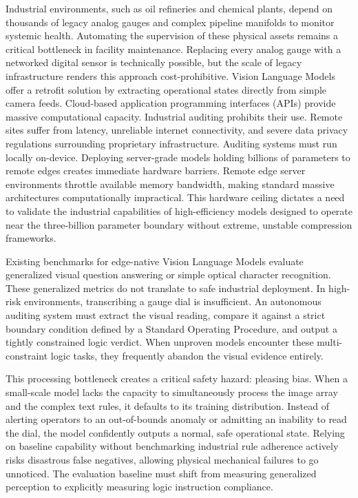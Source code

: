 \documentclass{article}
\begin{document}
Industrial environments, such as oil refineries and chemical plants, depend on thousands of legacy analog gauges and complex pipeline manifolds to monitor systemic health. Automating the supervision of these physical assets remains a critical bottleneck in facility maintenance. Replacing every analog gauge with a networked digital sensor is technically possible, but the scale of legacy infrastructure renders this approach cost-prohibitive. Vision Language Models offer a retrofit solution by extracting operational states directly from simple camera feeds. Cloud-based application programming interfaces (APIs) provide massive computational capacity. Industrial auditing prohibits their use. Remote sites suffer from latency, unreliable internet connectivity, and severe data privacy regulations surrounding proprietary infrastructure. Auditing systems must run locally on-device. Deploying server-grade models holding billions of parameters to remote edges creates immediate hardware barriers. Remote edge server environments throttle available memory bandwidth, making standard massive architectures computationally impractical. This hardware ceiling dictates a need to validate the industrial capabilities of high-efficiency models designed to operate near the three-billion parameter boundary without extreme, unstable compression frameworks.

Existing benchmarks for edge-native Vision Language Models evaluate generalized visual question answering or simple optical character recognition. These generalized metrics do not translate to safe industrial deployment. In high-risk environments, transcribing a gauge dial is insufficient. An autonomous auditing system must extract the visual reading, compare it against a strict boundary condition defined by a Standard Operating Procedure, and output a tightly constrained logic verdict. When unproven models encounter these multi-constraint logic tasks, they frequently abandon the visual evidence entirely. 

This processing bottleneck creates a critical safety hazard: pleasing bias. When a small-scale model lacks the capacity to simultaneously process the image array and the complex text rules, it defaults to its training distribution. Instead of alerting operators to an out-of-bounds anomaly or admitting an inability to read the dial, the model confidently outputs a normal, safe operational state. Relying on baseline capability without benchmarking industrial rule adherence actively risks disastrous false negatives, allowing physical mechanical failures to go unnoticed. The evaluation baseline must shift from measuring generalized perception to explicitly measuring logic instruction compliance.
\end{document}
